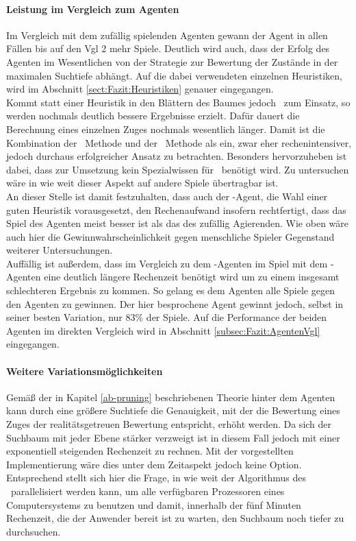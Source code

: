 \paragraph{Leistung im Vergleich zum Agenten }
Im Vergleich mit dem zufällig spielenden Agenten gewann der Agent \mxZitat{\abp} in allen Fällen bis auf den \ac{Vgl} 2 mehr Spiele. Deutlich wird auch, dass der Erfolg des Agenten im Wesentlichen von der Strategie zur Bewertung der Zustände in der maximalen Suchtiefe abhängt. Auf die dabei verwendeten einzelnen Heuristiken, wird im Abschnitt \ref{sect:Fazit:Heuristiken} genauer eingegangen.
\\Kommt statt einer Heuristik in den Blättern des Baumes jedoch \mc\ zum Einsatz, so werden nochmals deutlich bessere Ergebnisse erzielt. Dafür dauert die Berechnung eines einzelnen Zuges nochmals wesentlich länger. Damit ist die Kombination der \ababs\ Methode und der \mc\ Methode als ein, zwar eher rechenintensiver, jedoch durchaus erfolgreicher Ansatz zu betrachten. Besonders hervorzuheben ist dabei, dass zur Umsetzung kein Spezialwissen für \ot\ benötigt wird. Zu untersuchen wäre in wie weit dieser Aspekt auf andere Spiele übertragbar ist.
\\An dieser Stelle ist damit festzuhalten, dass auch der \mxZitat{\abp}-Agent, die Wahl einer guten Heuristik vorausgesetzt, den Rechenaufwand insofern rechtfertigt, dass das Spiel des Agenten meist besser ist als das des zufällig Agierenden. Wie oben wäre auch hier die Gewinnwahrscheinlichkeit gegen menschliche Spieler Gegenstand weiterer Untersuchungen.
\\Auffällig ist außerdem, dass im Vergleich zu dem \mxZitat{\mc}-Agenten im Spiel mit dem -Agenten eine deutlich längere Rechenzeit benötigt wird um zu einem insgesamt schlechteren Ergebnis zu kommen. So gelang es dem Agenten \mxZitat{\mc} alle Spiele gegen den Agenten  zu gewinnen. Der hier besprochene Agent gewinnt jedoch, selbst in seiner besten Variation, nur $83\%$ der Spiele. Auf die Performance der beiden Agenten im direkten Vergleich wird in Abschnitt \ref{subsec:Fazit:AgentenVgl} eingegangen.
\paragraph{Weitere Variationsmöglichkeiten}
Gemäß der in Kapitel \ref{ab-pruning} beschriebenen Theorie hinter dem Agenten \mxZitat{\abp} kann durch eine größere Suchtiefe  die Genauigkeit, mit der die Bewertung eines Zuges der realitätsgetreuen Bewertung entspricht, erhöht werden. Da sich der Suchbaum mit jeder Ebene stärker verzweigt ist in diesem Fall jedoch mit einer exponentiell steigenden Rechenzeit zu rechnen. Mit der vorgestellten Implementierung wäre dies unter dem Zeitaspekt jedoch keine Option. Entsprechend stellt sich hier die Frage, in wie weit der Algorithmus des \ababs\ parallelisiert werden kann, um alle verfügbaren Prozessoren eines Computersystems zu benutzen und damit, innerhalb der fünf Minuten Rechenzeit, die der Anwender bereit ist zu warten, den Suchbaum noch tiefer zu durchsuchen.


